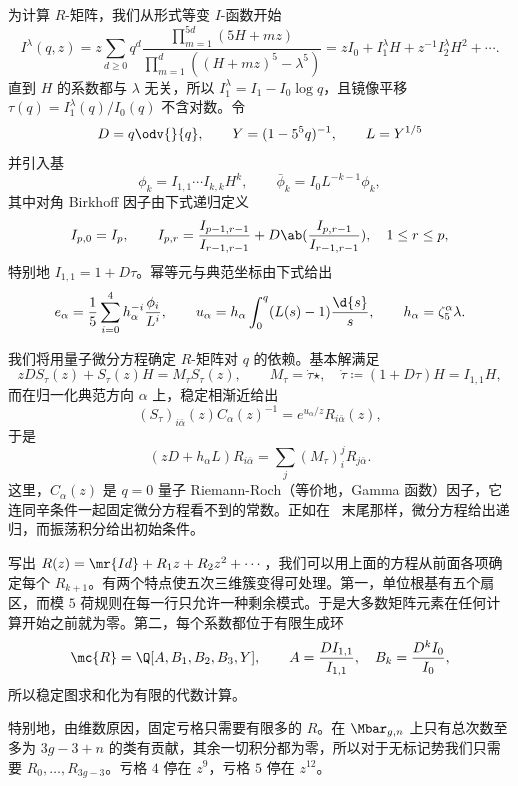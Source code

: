 为计算 \(R\)-矩阵，我们从形式等变 \(I\)-函数开始
\[ I^{\lambda}(q,z) = z\sum_{d\geq0}q^d \frac{\prod_{m=1}^{5d}(5H+mz)}{\prod_{m=1}^d ((H+mz)^5 - \lambda^5)} = zI_0 + I_1^{\lambda}H + z^{-1}I_2^{\lambda}H^2 + \cdots. \]
直到 \(H\) 的系数都与 \(\lambda\) 无关，所以 \(I_1^{\lambda} = I_1 - I_0 \log q\)，且镜像平移 \(\tau(q) = I_1^{\lambda}(q)/I_0(q)\) 不含对数。令
\[ D = q\odv{}{q}, \qquad Y = (1-5^5q)^{-1}, \qquad L = Y^{1/5} \]
并引入基
\[ \phi_k = I_{1,1}\cdots I_{k,k}H^k, \qquad \bar{\phi}_k = I_0 L^{-k-1}\phi_k, \]
其中对角 Birkhoff 因子由下式递归定义
\[ I_{p,0} = I_p, \qquad I_{p,r} = \frac{I_{p-1,r-1}}{I_{r-1,r-1}} + D \ab( \frac{I_{p,r-1}}{I_{r-1,r-1}}), \quad 1 \leq r \leq p, \]
特别地 \(I_{1,1} = 1+D\tau\)。幂等元与典范坐标由下式给出
\[ e_{\alpha} = \frac{1}{5}\sum_{i=0}^4 h_{\alpha}^{-i}\frac{\phi_i}{L^i}, \qquad u_{\alpha} = h_{\alpha}\int_0^q (L(s)-1)\frac{\d{s}}{s}, \qquad h_{\alpha} = \zeta_5^{\alpha}\lambda. \]

我们将用量子微分方程确定 \(R\)-矩阵对 \(q\) 的依赖。基本解满足
\[ zDS_{\tau}(z) + S_{\tau}(z)H = M_{\tau}S_{\tau}(z), \qquad M_{\tau} = \dot{\tau}\star, \quad \dot{\tau} \coloneqq (1+D\tau)H = I_{1,1}H, \]
而在归一化典范方向 \(\alpha\) 上，稳定相渐近给出
\[ (S_{\tau})_{i\bar{\alpha}}(z)C_{\alpha}(z)^{-1} = e^{u_{\alpha}/z}R_{i\bar{\alpha}}(z), \]
于是
\[ (zD+h_{\alpha}L)R_{i\bar{\alpha}} = \sum_j (M_{\tau})_i^j R_{j\bar{\alpha}}. \]
这里，\(C_{\alpha}(z)\) 是 \(q=0\) 量子 Riemann-Roch（等价地，Gamma 函数）因子，它连同辛条件一起固定微分方程看不到的常数。正如在~ 末尾那样，微分方程给出递归，而振荡积分给出初始条件。

写出 \(R(z) = \mr{Id} + R_1 z + R_2 z^2 + \cdots\)，我们可以用上面的方程从前面各项确定每个 \(R_{k+1}\)。有两个特点使五次三维簇变得可处理。第一，单位根基有五个扇区，而模 \(5\) 荷规则在每一行只允许一种剩余模式。于是大多数矩阵元素在任何计算开始之前就为零。第二，每个系数都位于有限生成环
\[ \mc{R} = \Q[A,B_1,B_2,B_3,Y], \qquad A = \frac{DI_{1,1}}{I_{1,1}}, \quad B_k = \frac{D^k I_0}{I_0}, \]
所以稳定图求和化为有限的代数计算。

\begin{rmk}
    特别地，由维数原因，固定亏格只需要有限多的 \(R\)。在 \(\Mbar_{g,n}\) 上只有总次数至多为 \(3g-3+n\) 的类有贡献，其余一切积分都为零，所以对于无标记势我们只需要 \(R_0, \ldots, R_{3g-3}\)。亏格 \(4\) 停在 \(z^9\)，亏格 \(5\) 停在 \(z^{12}\)。
\end{rmk}

